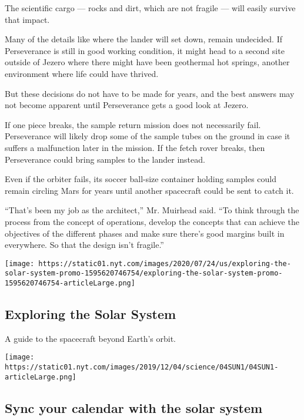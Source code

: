 The scientific cargo --- rocks and dirt, which are not fragile --- will
easily survive that impact.

Many of the details like where the lander will set down, remain
undecided. If Perseverance is still in good working condition, it might
head to a second site outside of Jezero where there might have been
geothermal hot springs, another environment where life could have
thrived.

But these decisions do not have to be made for years, and the best
answers may not become apparent until Perseverance gets a good look at
Jezero.

If one piece breaks, the sample return mission does not necessarily
fail. Perseverance will likely drop some of the sample tubes on the
ground in case it suffers a malfunction later in the mission. If the
fetch rover breaks, then Perseverance could bring samples to the lander
instead.

Even if the orbiter fails, its soccer ball-size container holding
samples could remain circling Mars for years until another spacecraft
could be sent to catch it.

``That's been my job as the architect,'' Mr. Muirhead said. ``To think
through the process from the concept of operations, develop the concepts
that can achieve the objectives of the different phases and make sure
there's good margins built in everywhere. So that the design isn't
fragile.''

\href{https://www.nytimes.com/interactive/2020/science/exploring-the-solar-system.html}{}

\texttt{[image: https://static01.nyt.com/images/2020/07/24/us/exploring-the-solar-system-promo-1595620746754/exploring-the-solar-system-promo-1595620746754-articleLarge.png]}

\hypertarget{exploring-the-solar-system}{%
\subsection{Exploring the Solar
System}\label{exploring-the-solar-system}}

A guide to the spacecraft beyond Earth's orbit.

\href{https://www.nytimes.com/interactive/2020/science/2020-astronomy-space-calendar.html}{}

\texttt{[image: https://static01.nyt.com/images/2019/12/04/science/04SUN1/04SUN1-articleLarge.png]}

\hypertarget{sync-your-calendar-with-the-solar-system}{%
\subsection{Sync your calendar with the solar
system}\label{sync-your-calendar-with-the-solar-system}}


